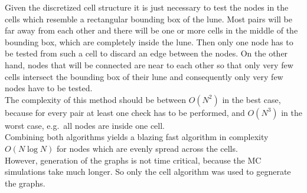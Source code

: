         Given the discretized cell structure it is just necessary to test the nodes in the cells which
        resemble a rectangular bounding box of the lune. Most pairs will be
        far away from each other and there will be one or more cells in the
        middle of the bounding box, which are completely inside the lune.
        Then only one node has to be tested from such a cell to discard an
        edge between the nodes. On the other hand, nodes that will be connected
        are near to each other so that only very few cells intersect the bounding
        box of their lune and consequently only very few nodes have to be tested.\\
        The complexity of this method should be between \(O(N^2)\) in the
        best case, because for every pair at least one check has to be performed,
        and \(O(N^3)\) in the worst case, e.g.\ all nodes are inside one
        cell.\\
        Combining both algorithms yields a blazing fast algorithm in complexity
        \(O(N \log N)\) for nodes which are evenly spread across the cells.\\
        However, generation of the graphs is not time critical, because
        the MC simulations take much longer. So only the cell algorithm
        was used to gegnerate the graphs.\\

